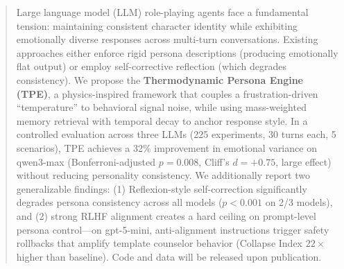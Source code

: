 \begin{abstract}
Large language model (LLM) role-playing agents face a fundamental tension: maintaining consistent character identity while exhibiting emotionally diverse responses across multi-turn conversations. Existing approaches either enforce rigid persona descriptions (producing emotionally flat output) or employ self-corrective reflection (which degrades consistency). We propose the \textbf{Thermodynamic Persona Engine (TPE)}, a physics-inspired framework that couples a frustration-driven ``temperature'' to behavioral signal noise, while using mass-weighted memory retrieval with temporal decay to anchor response style. In a controlled evaluation across three LLMs (225 experiments, 30 turns each, 5 scenarios), TPE achieves a 32\% improvement in emotional variance on qwen3-max (Bonferroni-adjusted $p = 0.008$, Cliff's $d = +0.75$, large effect) without reducing personality consistency. We additionally report two generalizable findings: (1) Reflexion-style self-correction significantly degrades persona consistency across all models ($p < 0.001$ on 2/3 models), and (2) strong RLHF alignment creates a hard ceiling on prompt-level persona control---on gpt-5-mini, anti-alignment instructions trigger safety rollbacks that amplify template counselor behavior (Collapse Index $22\times$ higher than baseline). Code and data will be released upon publication.
\end{abstract}
